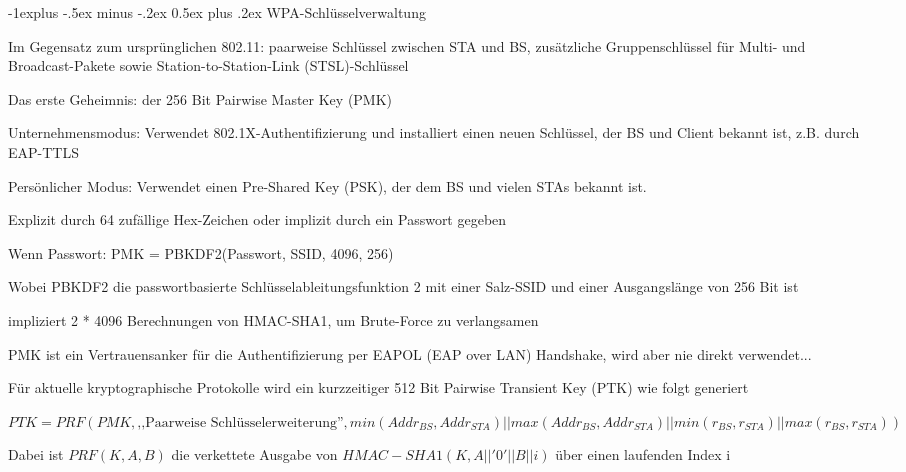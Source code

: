 \documentclass[a4paper]{article}
\makeatletter
\renewcommand{\subsection}{\@startsection{subsection}{2}{0mm}%
 {-1explus -.5ex minus -.2ex}%
 {0.5ex plus .2ex}%
 {\normalfont\normalsize\bfseries}}
\makeatother
\begin{document}
\begin{multicols}{3}
      \subsection{WPA-Schlüsselverwaltung}
      \begin{itemize*}
            \item Im Gegensatz zum ursprünglichen 802.11: paarweise Schlüssel zwischen STA und BS, zusätzliche Gruppenschlüssel für Multi- und Broadcast-Pakete sowie Station-to-Station-Link (STSL)-Schlüssel
            \item Das erste Geheimnis: der 256 Bit Pairwise Master Key (PMK)
            \begin{itemize*}
                  \item Unternehmensmodus: Verwendet 802.1X-Authentifizierung und installiert einen neuen Schlüssel, der BS und Client bekannt ist, z.B. durch EAP-TTLS
                  \item Persönlicher Modus: Verwendet einen Pre-Shared Key (PSK), der dem BS und vielen STAs bekannt ist.
                  \begin{itemize*}
                        \item Explizit durch 64 zufällige Hex-Zeichen oder implizit durch ein Passwort gegeben
                        \item Wenn Passwort: PMK = PBKDF2(Passwort, SSID, 4096, 256)
                        \item Wobei PBKDF2 die passwortbasierte Schlüsselableitungsfunktion 2 mit einer Salz-SSID und einer Ausgangslänge von 256 Bit ist
                        \item impliziert 2 * 4096 Berechnungen von HMAC-SHA1, um Brute-Force zu verlangsamen
                  \end{itemize*}
            \end{itemize*}
            \item PMK ist ein Vertrauensanker für die Authentifizierung per EAPOL (EAP over LAN) Handshake, wird aber nie direkt verwendet...
            \item Für aktuelle kryptographische Protokolle wird ein kurzzeitiger 512 Bit Pairwise Transient Key (PTK) wie folgt generiert
            \begin{itemize*}
                  \item $PTK = PRF(PMK, \text{,,Paarweise Schlüsselerweiterung''}, min(Addr_{BS}, Addr_{STA}) || max(Addr_{BS}, Addr_{STA}) || min(r_{BS}, r_{STA}) || max(r_{BS}, r_{STA}))$
                  \item Dabei ist $PRF(K, A, B)$ die verkettete Ausgabe von $HMAC-SHA1(K, A || '0' || B || i)$ über einen laufenden Index i

\end{itemize*}
\end{itemize*}
\end{multicols}
\end{document}
